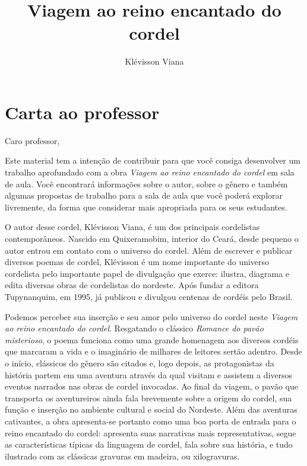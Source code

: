 \documentclass[11pt]{extarticle}
\newcommand{\AutorLivro}{Klévisson Viana}
\newcommand{\TituloLivro}{Viagem ao reino encantado do cordel}
\newcommand{\colaborador}{Paulo Pompermaier}
\begin{document}
\title{\TituloLivro}
\author{\AutorLivro}
\def\authornotes{\colaborador}

\date{}
\maketitle

\tableofcontents

\section{Carta ao professor}

Caro professor,

Este material tem a intenção de contribuir para que você consiga desenvolver um trabalho aprofundado com a obra \textit{Viagem ao reino encantado do cordel} em sala de aula.
Você encontrará informações sobre o autor, sobre o gênero e também 
algumas propostas de trabalho para a sala de aula que você poderá explorar livremente, 
da forma que considerar mais apropriada para os seus estudantes.

O autor desse cordel, Klévisson Viana, é um dos principais cordelistas contemporâneos.
Nascido em Quixeramobim, interior do Ceará, desde pequeno o autor entrou em contato com o universo do cordel.
Além de escrever e publicar diversos poemas de cordel, Klévisson é um nome importante do universo cordelista pelo importante papel de divulgação que exerce: ilustra, diagrama e edita diversas obras de cordelistas do nordeste. 
Após fundar a editora Tupynanquim, em 1995, já publicou e divulgou centenas de cordéis pelo Brasil.

Podemos perceber sua inserção e seu amor pelo universo do cordel neste
\textit{Viagem ao reino encantado do cordel}. Resgatando o clássico \textit{Romance do pavão misterioso}, o poema funciona como uma grande homenagem aos diversos cordéis que marcaram a vida e o imaginário de milhares de leitores sertão adentro. Desde o início, clássicos do gênero são citados e, logo depois, as protagonistas da história partem em uma aventura através da qual visitam e assistem a diversos eventos narrados nas obras de cordel invocadas. Ao final da viagem, o pavão que transporta os aventureiros ainda fala brevemente sobre a origem do cordel, sua função e inserção no ambiente cultural e social do Nordeste.
Além das aventuras cativantes, a obra apresenta-se portanto como uma boa porta de entrada para o reino encantado do cordel: apresenta suas narrativas mais representativas, segue as características típicas da linguagem de cordel, fala sobre sua história, e tudo ilustrado com as clássicas gravuras em madeira, ou xilogravuras.
\end{document}
